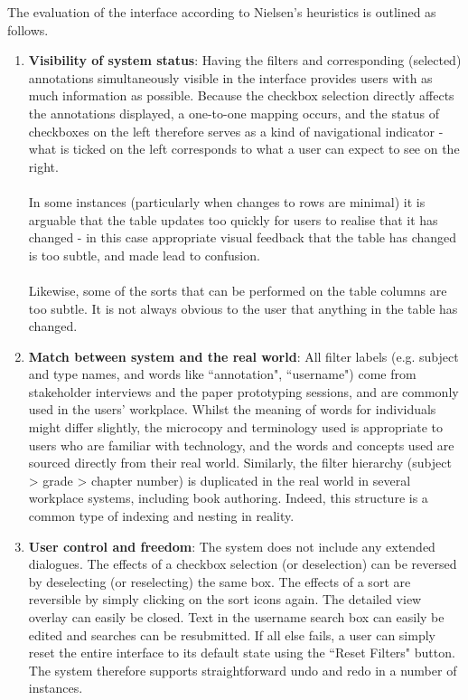 The evaluation of the interface according to Nielsen's heuristics \citep{NielsenMack} is outlined as follows.
\begin{enumerate}
 \item \textbf{Visibility of system status}: Having the filters and corresponding (selected) annotations simultaneously visible in the interface provides users with as much information as possible. Because the checkbox selection directly affects the annotations displayed, a one-to-one mapping occurs, and the status of checkboxes on the left therefore serves as a kind of navigational indicator - what is ticked on the left corresponds to what a user can expect to see on the right. \\
 \\
 In some instances (particularly when changes to rows are minimal) it is arguable that the table updates too quickly for users to realise that it has changed - in this case appropriate visual feedback that the table has changed is too subtle, and made lead to confusion. \\ 
 \\
 Likewise, some of the sorts that can be performed on the table columns are too subtle. It is not always obvious to the user that anything in the table has changed.

\item \textbf{Match between system and the real world}: All filter labels (e.g. subject and type names, and words like ``annotation", ``username") come from stakeholder interviews and the paper prototyping sessions, and are commonly used in the users' workplace. Whilst the meaning of words for individuals might differ slightly, the microcopy and terminology used is appropriate to users who are familiar with technology, and the words and concepts used are sourced directly from their real world. Similarly, the filter hierarchy (subject > grade > chapter number) is duplicated in the real world in several workplace systems, including book authoring. Indeed, this structure is a common type of indexing and nesting in reality. 

\item \textbf{User control and freedom}: The system does not include any extended dialogues. The effects of a checkbox selection (or deselection) can be reversed by deselecting (or reselecting) the same box. The effects of a sort are reversible by simply clicking on the sort icons again. The detailed view overlay can easily be closed. Text in the username search box can easily be edited and searches can be resubmitted. If all else fails, a user can simply reset the entire interface to its default state using the ``Reset Filters" button. The system therefore supports straightforward undo and redo in a number of instances.


\end{enumerate}
